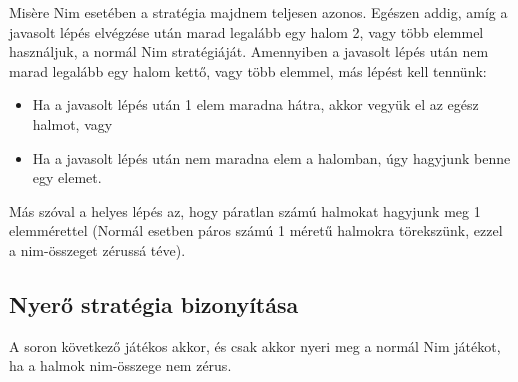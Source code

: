 Misère Nim esetében a stratégia majdnem teljesen azonos. Egészen addig, amíg a javasolt lépés elvégzése után marad legalább egy halom 2, vagy több elemmel használjuk, a normál Nim stratégiáját. Amennyiben a javasolt lépés után nem marad legalább egy halom kettő, vagy több elemmel, más lépést kell tennünk:
\begin{itemize}
	\item Ha a javasolt lépés után 1 elem maradna hátra, akkor vegyük el az egész halmot, vagy
	\item Ha a javasolt lépés után nem maradna elem a halomban, úgy hagyjunk benne egy elemet.
\end{itemize}
Más szóval a helyes lépés az, hogy páratlan számú halmokat hagyjunk meg 1 elemmérettel (Normál esetben páros számú 1 méretű halmokra törekszünk, ezzel a nim-összeget zérussá téve).


\subsection{Nyerő stratégia bizonyítása}
\begin{theorem}
	A soron következő játékos akkor, és csak akkor nyeri meg a normál Nim játékot, ha a halmok nim-összege nem zérus.
\end{theorem}

